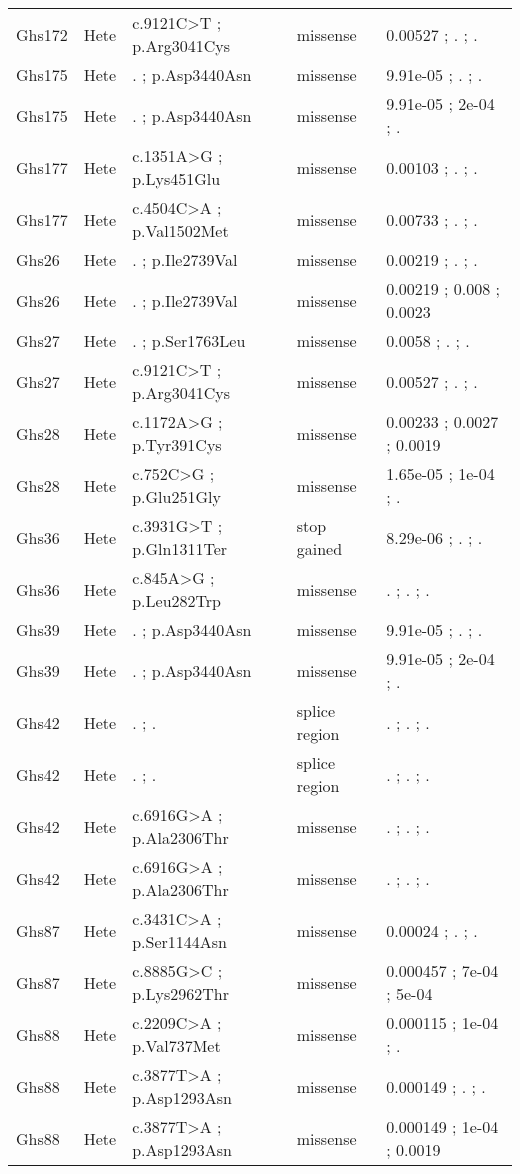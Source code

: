 \documentclass[12pt,twoside]{reedthesis}
\theoremstyle{definition}
\theoremstyle{definition}
\theoremstyle{remark}
\begin{document}
\begin{landscape}
\begin{longtable}[t]{lllll}
  Ghs172 & Hete & c.9121C>T ; p.Arg3041Cys & missense & 0.00527 ; . ; .\\
  Ghs175 & Hete & . ; p.Asp3440Asn & missense & 9.91e-05 ; . ; .\\
  \addlinespace
  Ghs175 & Hete & . ; p.Asp3440Asn & missense & 9.91e-05 ; 2e-04 ; .\\
  Ghs177 & Hete & c.1351A>G ; p.Lys451Glu & missense & 0.00103 ; . ; .\\
  Ghs177 & Hete & c.4504C>A ; p.Val1502Met & missense & 0.00733 ; . ; .\\
  Ghs26 & Hete & . ; p.Ile2739Val & missense & 0.00219 ; . ; .\\
  Ghs26 & Hete & . ; p.Ile2739Val & missense & 0.00219 ; 0.008 ; 0.0023\\
  \addlinespace
  Ghs27 & Hete & . ; p.Ser1763Leu & missense & 0.0058 ; . ; .\\
  Ghs27 & Hete & c.9121C>T ; p.Arg3041Cys & missense & 0.00527 ; . ; .\\
  Ghs28 & Hete & c.1172A>G ; p.Tyr391Cys & missense & 0.00233 ; 0.0027 ; 0.0019\\
  Ghs28 & Hete & c.752C>G ; p.Glu251Gly & missense & 1.65e-05 ; 1e-04 ; .\\
  Ghs36 & Hete & c.3931G>T ; p.Gln1311Ter & stop gained & 8.29e-06 ; . ; .\\
  \addlinespace
  Ghs36 & Hete & c.845A>G ; p.Leu282Trp & missense & . ; . ; .\\
  Ghs39 & Hete & . ; p.Asp3440Asn & missense & 9.91e-05 ; . ; .\\
  Ghs39 & Hete & . ; p.Asp3440Asn & missense & 9.91e-05 ; 2e-04 ; .\\
  Ghs42 & Hete & . ; . & splice region & . ; . ; .\\
  Ghs42 & Hete & . ; . & splice region & . ; . ; .\\
  \addlinespace
  Ghs42 & Hete & c.6916G>A ; p.Ala2306Thr & missense & . ; . ; .\\
  Ghs42 & Hete & c.6916G>A ; p.Ala2306Thr & missense & . ; . ; .\\
  Ghs87 & Hete & c.3431C>A ; p.Ser1144Asn & missense & 0.00024 ; . ; .\\
  Ghs87 & Hete & c.8885G>C ; p.Lys2962Thr & missense & 0.000457 ; 7e-04 ; 5e-04\\
  Ghs88 & Hete & c.2209C>A ; p.Val737Met & missense & 0.000115 ; 1e-04 ; .\\
  \addlinespace
  Ghs88 & Hete & c.3877T>A ; p.Asp1293Asn & missense & 0.000149 ; . ; .\\
  Ghs88 & Hete & c.3877T>A ; p.Asp1293Asn & missense & 0.000149 ; 1e-04 ; 0.0019\\
  \bottomrule
  \end{longtable}
  \end{landscape}
  
\end{document}
